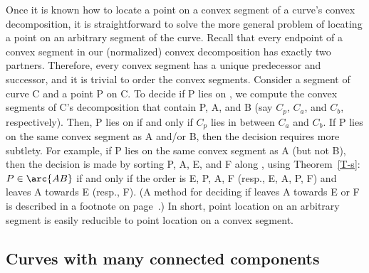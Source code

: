 Once it is known how to locate a point on a convex segment of a curve's
convex decomposition, it is straightforward to solve the more
general problem of locating a point on an arbitrary segment of the curve.
Recall that every endpoint of a convex segment in our (normalized) convex
decomposition has exactly two partners.
Therefore, every convex segment has a unique predecessor and successor,
and it is trivial to order the convex segments.
Consider a segment  of curve C and a point P on C.
To decide if P lies on , we compute the convex segments of C's 
decomposition that contain P, A, and B (say $C_{p}$, $C_{a}$, and $C_{b}$, 
respectively).
Then, P lies on  if and only if $C_{p}$ lies in between $C_{a}$ and
$C_{b}$.
If P lies on the same convex segment as A and/or B, then the decision
requires more subtlety.
For example, if P lies on the same convex segment  as A (but not B), then
the decision is made by sorting P, A, E, and F along , 
using Theorem~\ref{T-s}:
$P \in \arc{AB}$ if and only if the order is E, P, A, F (resp., E, A, P, F) and
 leaves A towards E (resp., F).
(A method for deciding if  leaves A towards E or F is described in a footnote 
on page~\pageref{alg-page}.)
In short, point location on an arbitrary segment is easily reducible to point
location on a convex segment.


\subsection{Curves with many connected components}

